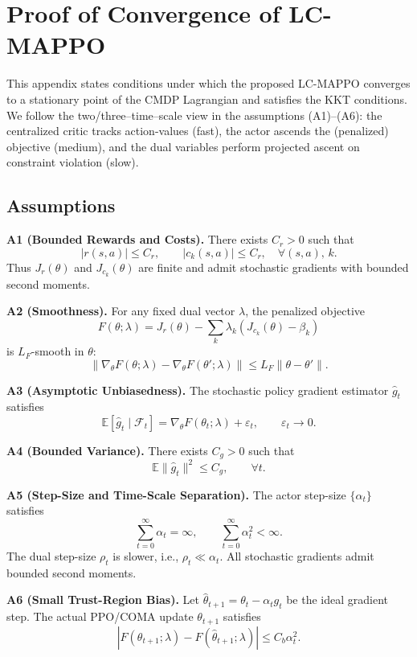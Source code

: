 \documentclass{article} %
\begin{document}
\newpage
\section{Proof of Convergence of LC-MAPPO}
\label{appendix:convergence}
This appendix states conditions under which the proposed LC-MAPPO converges to a stationary point of the CMDP Lagrangian and satisfies the KKT conditions. We follow the two/three–time–scale view in the assumptions (A1)–(A6): the centralized critic tracks action-values (fast), the actor ascends the (penalized) objective (medium), and the dual variables perform projected ascent on constraint violation (slow).


\subsection{Assumptions}

\textbf{A1 (Bounded Rewards and Costs).}
There exists $C_r>0$ such that
\[
|r(s,a)| \le C_r, \qquad |c_k(s,a)| \le C_r,
\quad \forall (s,a),\, k .
\]
Thus $J_r(\theta)$ and $J_{c_k}(\theta)$ are finite and admit stochastic
gradients with bounded second moments.

\textbf{A2 (Smoothness).}
For any fixed dual vector $\lambda$, the penalized objective
\[
F(\theta;\lambda)
= J_r(\theta) - \sum_k \lambda_k \left(J_{c_k}(\theta)-\beta_k\right)
\]
is $L_F$-smooth in $\theta$:
\[
\|\nabla_\theta F(\theta;\lambda) - \nabla_\theta F(\theta';\lambda)\|
\le L_F\|\theta-\theta'\|.
\]

\textbf{A3 (Asymptotic Unbiasedness).}
The stochastic policy gradient estimator $\hat g_t$ satisfies
\[
\mathbb{E}[\hat g_t \mid \mathcal{F}_t]
= \nabla_\theta F(\theta_t;\lambda) + \varepsilon_t,
\qquad \varepsilon_t\to 0 .
\]

\textbf{A4 (Bounded Variance).}
There exists $C_g>0$ such that
\[
\mathbb{E}\|\hat g_t\|^2 \le C_g, \qquad \forall t.
\]

\textbf{A5 (Step-Size and Time-Scale Separation).}
The actor step-size $\{\alpha_t\}$ satisfies
\[
\sum_{t=0}^\infty \alpha_t = \infty,
\qquad
\sum_{t=0}^\infty \alpha_t^2 < \infty .
\]
The dual step-size $\rho_t$ is slower, i.e., $\rho_t \ll \alpha_t$.
All stochastic gradients admit bounded second moments.

\textbf{A6 (Small Trust-Region Bias).}
Let $\hat\theta_{t+1}=\theta_t-\alpha_t g_t$ be the ideal gradient step.
The actual PPO/COMA update $\theta_{t+1}$ satisfies
\[
|F(\theta_{t+1};\lambda)-F(\hat\theta_{t+1};\lambda)|
\le C_b \alpha_t^2 .
\]
\end{document}
